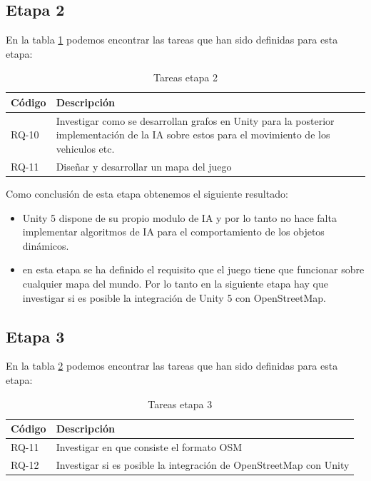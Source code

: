 \subsection{Etapa 2}

En la tabla \ref{tabla:requisitosEtapa2} podemos encontrar las tareas que han sido definidas para esta etapa:

\begin{table}[H]
\begin{center}
\begin{tabular}{|p{1.5cm}| p{10.5cm}|}
\hline 
Código & Descripción \\
\hline \hline
RQ-10 & Investigar como se desarrollan grafos en Unity para la posterior implementación de la IA sobre estos para el movimiento de los vehiculos etc. \\ \hline
RQ-11 & Diseñar y desarrollar un mapa del juego\\ \hline
\end{tabular}
\caption{Tareas etapa 2}
\label{tabla:requisitosEtapa2}
\end{center}
\end{table}

Como conclusión de esta etapa obtenemos el siguiente resultado:
\begin{itemize}
	\item Unity 5 dispone de su propio modulo de IA y por lo tanto no hace falta implementar algoritmos de IA para el comportamiento de los objetos dinámicos.
	\item en esta etapa se ha definido el requisito que el juego tiene que funcionar sobre cualquier mapa del mundo. Por lo tanto en la siguiente etapa hay que investigar si es posible la integración de Unity 5 con OpenStreetMap.
\end{itemize}

\newpage

\subsection{Etapa 3}

En la tabla \ref{tabla:requisitosEtapa3} podemos encontrar las tareas que han sido definidas para esta etapa:

\begin{table}[H]
\begin{center}
\begin{tabular}{|p{1.5cm}| p{10.5cm}|}
\hline 
Código & Descripción \\
\hline \hline
RQ-11 & Investigar en que consiste el formato OSM\\ \hline
RQ-12 & Investigar si es posible la integración de OpenStreetMap con Unity\\ \hline
\end{tabular}
\caption{Tareas etapa 3}
\label{tabla:requisitosEtapa3}
\end{center}
\end{table}

